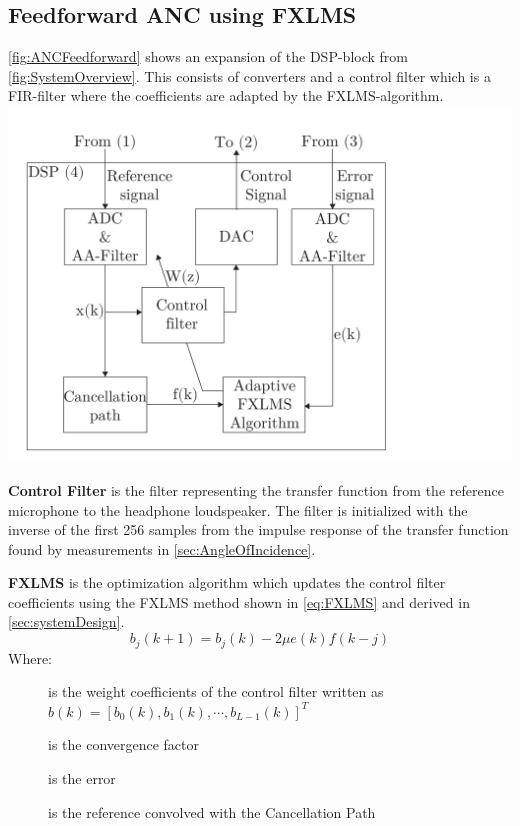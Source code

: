 \subsection*{Feedforward ANC using FXLMS}
\autoref{fig:ANCFeedforward} shows an expansion of the DSP-block from \autoref{fig:SystemOverview}. This consists of converters and a control filter which is a FIR-filter where the coefficients are adapted by the FXLMS-algorithm. 
{
	\includegraphics[width=1\columnwidth]{figures/ArticleIllustrations/ANCFeedForward}
	\label{fig:ANCFeedforward}
}



\textbf{Control Filter} is the filter representing the transfer function from the reference microphone to the headphone loudspeaker. The filter is initialized with the inverse of the first 256 samples from the impulse response of the transfer function found by measurements in \autoref{sec:AngleOfIncidence}.  

\textbf{FXLMS} is the optimization algorithm which updates the control filter coefficients using the FXLMS method shown in \autoref{eq:FXLMS} and derived in \autoref{sec:systemDesign}. 
\begin{equation}\label{eq:FXLMS}
b_j(k+1) = b_j(k) - 2\mu e(k)f(k-j) 
\end{equation}
Where:
\vspace{-8mm} %
\begin{description}
	\item[] is the weight coefficients of the control filter written as  $b(k)=[b_0(k),b_1(k), \cdots, b_{L-1}(k)]^T$
	\item[\text{$\mu$}] is the convergence factor
	\item[] is the error 
	\item[] is the reference convolved with the Cancellation Path
\end{description}

